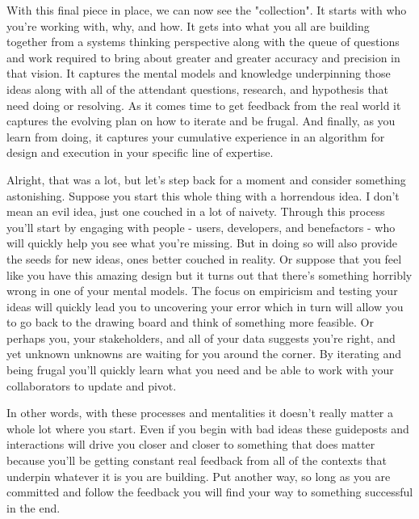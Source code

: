\documentclass[11pt,a5paper]{book}
\begin{document}
With this final piece in place, we can now see the "collection". It starts with who you're working with, why, and how. It gets into what you all are building together from a systems thinking perspective along with the queue of questions and work required to bring about greater and greater accuracy and precision in that vision. It captures the mental models and knowledge underpinning those ideas along with all of the attendant questions, research, and hypothesis that need doing or resolving. As it comes time to get feedback from the real world it captures the evolving plan on how to iterate and be frugal. And finally, as you learn from doing, it captures your cumulative experience in an algorithm for design and execution in your specific line of expertise.
\newline

Alright, that was a lot, but let's step back for a moment and consider something astonishing. Suppose you start this whole thing with a horrendous idea. I don't mean an evil idea, just one couched in a lot of naivety. Through this process you'll start by engaging with people - users, developers, and benefactors - who will quickly help you see what you're missing. But in doing so will also provide the seeds for new ideas, ones better couched in reality. Or suppose that you feel like you have this amazing design but it turns out that there's something horribly wrong in one of your mental models. The focus on empiricism and testing your ideas will quickly lead you to uncovering your error which in turn will allow you to go back to the drawing board and think of something more feasible. Or perhaps you, your stakeholders, and all of your data suggests you're right, and yet unknown unknowns are waiting for you around the corner. By iterating and being frugal you'll quickly learn what you need and be able to work with your collaborators to update and pivot.
\newline

In other words, with these processes and mentalities it doesn't really matter a whole lot where you start. Even if you begin with bad ideas these guideposts and interactions will drive you closer and closer to something that does matter because you'll be getting constant real feedback from all of the contexts that underpin whatever it is you are building. Put another way, so long as you are committed and follow the feedback you will find your way to something successful in the end. 
\newline
\end{document}
